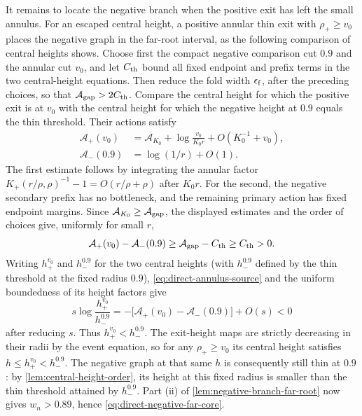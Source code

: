 It remains to locate the negative branch when the positive exit has
left the small annulus. For an escaped central height, a positive
annular thin exit with \(\rho_+\ge v_0\) places the negative graph in
the far-root interval, as the following comparison of central heights
shows.
Choose first the compact negative comparison cut \(0.9\) and the
annular cut \(v_0\), and let \(C_{\rm th}\) bound all fixed endpoint and
prefix terms in the two central-height equations.  Then reduce the fold
width \(\epsilon_{\rm f}\), after the preceding choices, so that
\(\mathcal A_{\rm gap}>2C_{\rm th}\).  Compare the central height for
which the positive exit is at \(v_0\) with the central height for which
the negative height at \(0.9\) equals the thin threshold.  Their actions satisfy
\begin{equation}
\label{eq:direct-fold-far-threshold}
 \begin{split}
 \mathcal A_+(v_0)
    &=\mathcal A_{K_0}+\log\frac{v_0}{K_0r}
                                   +O(K_0^{-1}+v_0),\\
 \mathcal A_-(0.9)&=\log(1/r)+O(1).
 \end{split}
\end{equation}
The first estimate follows by integrating the annular factor
\(K_+(r/\rho,\rho)^{-1}-1=O(r/\rho+\rho)\) after \(K_0r\).
For the second, the negative secondary prefix has no
bottleneck, and the remaining primary action has fixed
endpoint margins.
Since \(\mathcal A_{K_0}\ge\mathcal A_{\rm gap}\), the displayed estimates
and the order of choices give, uniformly for small \(r\),
\begin{equation}
\label{eq:direct-fold-far-action-gap}
 \mathcal A_+(v_0)-\mathcal A_-(0.9)
 \ge \mathcal A_{\rm gap}-C_{\rm th}\ge C_{\rm th}>0.
\end{equation}
Writing \(h_+^{v_0}\) and \(h_-^{0.9}\) for the two central heights
(with \(h_-^{0.9}\) defined by the thin threshold at the fixed radius
\(0.9\)),
\eqref{eq:direct-annulus-source} and the uniform boundedness of its
height factors give
\begin{equation}
\label{eq:direct-fold-far-height-order}
 s\log\frac{h_+^{v_0}}{h_-^{0.9}}
 =-\bigl[\mathcal A_+(v_0)-\mathcal A_-(0.9)\bigr]+O(s)<0
\end{equation}
after reducing \(s\).  Thus \(h_+^{v_0}<h_-^{0.9}\).  The exit-height
maps are strictly decreasing in their radii by the event equation, so
for any \(\rho_+\ge v_0\) its central height satisfies
\(h\le h_+^{v_0}<h_-^{0.9}\). The negative graph at that same \(h\)
is consequently still thin at \(0.9\): by
\cref{lem:central-height-order}, its height at this fixed radius is
smaller than the thin threshold attained by \(h_-^{0.9}\).
Part (ii) of \cref{lem:negative-branch-far-root} now gives
\(w_n>0.89\), hence \eqref{eq:direct-negative-far-core}.

